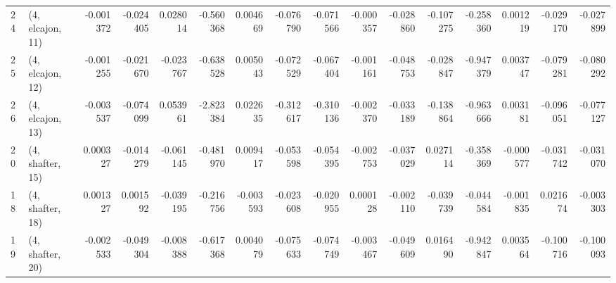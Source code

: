 \begin{tabular}{llrrrrrrrrrrrrrr}
24 &  (4, elcajon, 11) &  -0.001372 & -0.024405 &  0.028014 &  -0.560368 &  0.004669 &  -0.076790 & -0.071566 & -0.000357 & -0.028860 & -0.107275 &  -0.258360 &  0.001219 & -0.029170 & -0.027899 \\
25 &  (4, elcajon, 12) &  -0.001255 & -0.021670 & -0.023767 &  -0.638528 &  0.005043 &  -0.072529 & -0.067404 & -0.001161 & -0.048753 & -0.028847 &  -0.947379 &  0.003747 & -0.079281 & -0.080292 \\
26 &  (4, elcajon, 13) &  -0.003537 & -0.074099 &  0.053961 &  -2.823384 &  0.022635 &  -0.312617 & -0.310136 & -0.002370 & -0.033189 & -0.138864 &  -0.963666 &  0.003181 & -0.096051 & -0.077127 \\
20 &  (4, shafter, 15) &   0.000327 & -0.014279 & -0.061145 &  -0.481970 &  0.009417 &  -0.053598 & -0.054395 & -0.002753 & -0.037029 &  0.027114 &  -0.358369 & -0.000577 & -0.031742 & -0.031070 \\
18 &  (4, shafter, 18) &   0.001327 &  0.001592 & -0.039195 &  -0.216756 & -0.003593 &  -0.023608 & -0.020955 &  0.000128 & -0.002110 & -0.039739 &  -0.044584 & -0.001835 &  0.021674 & -0.003303 \\
19 &  (4, shafter, 20) &  -0.002533 & -0.049304 & -0.008388 &  -0.617368 &  0.004079 &  -0.075633 & -0.074749 & -0.003467 & -0.049609 &  0.016490 &  -0.942847 &  0.003564 & -0.100716 & -0.100093 \\
\bottomrule
\end{tabular}
